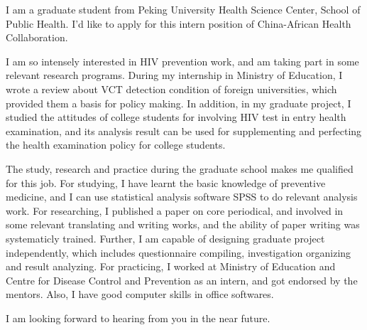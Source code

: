 \documentclass[10pt,stdletter,dateno,sigleft]{newlfm} %
\begin{document}
\begin{newlfm}


\begin{spacing}{1.5}
I am a graduate student from Peking University Health Science Center, School of Public Health. I'd like to apply for this intern position of China-African Health Collaboration.

I am so intensely interested in HIV prevention work, and am taking part in some relevant research programs.  During my internship in Ministry of Education, I wrote a review about  VCT detection condition of foreign universities, which provided them a basis for policy making. In addition, in my graduate project, I studied the attitudes of college students for involving HIV test in entry health examination, and its analysis result can be used for supplementing and perfecting the health examination policy for college students.

The study, research and practice during the graduate school makes me qualified for this job. For studying, I have learnt the basic knowledge of preventive medicine, and I can use statistical analysis software SPSS to do relevant analysis work. For researching, I published a paper on core periodical, and involved in some relevant translating and writing works, and the ability of paper writing was systematicly trained. Further, I am capable of designing graduate project independently, which includes questionnaire compiling, investigation organizing and result analyzing. For practicing, I worked at Ministry of Education and Centre for Disease Control and Prevention as an intern, and got endorsed by the mentors. Also, I have good computer skills in office softwares.

I am looking forward to hearing from you in the near future.
\end{spacing}


\end{newlfm}
\end{document}
